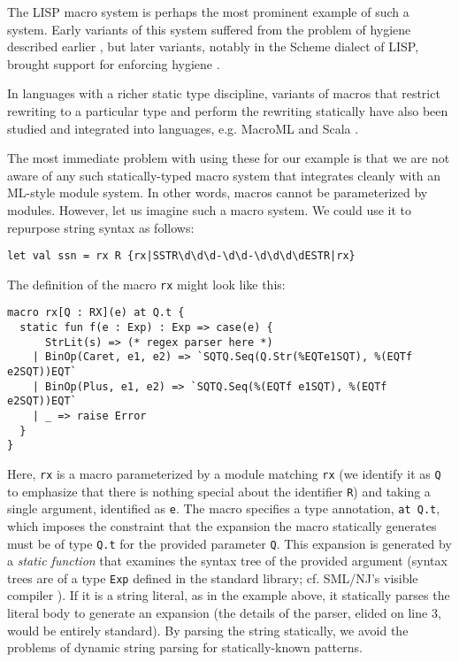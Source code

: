 {{The LISP macro system \cite{Hart63a} is perhaps the most prominent example of such a system. Early variants of this system suffered from the problem of hygiene described earlier , but  later variants, notably in the Scheme dialect of LISP, brought support for enforcing hygiene \cite{Kohlbecker86a}. 

In languages with a richer static type discipline, variants of macros that restrict rewriting to a particular type and perform the rewriting statically have also been studied \cite{Herman10:Theory,ganz2001macros} and integrated into languages, e.g. MacroML \cite{ganz2001macros} and Scala \cite{ScalaMacros2013}.  %

The most immediate problem with using these for our example is that we are not aware of any such statically-typed macro system that integrates cleanly with an ML-style module system. In other words, macros cannot be parameterized by modules. However, let us imagine such a macro system. We could use it to repurpose string syntax  as follows:
\begin{lstlisting}[numbers=none]
let val ssn = rx R {rx|SSTR\d\d\d-\d\d-\d\d\d\dESTR|rx}
\end{lstlisting}

The definition of the macro \lstinline{rx} might look like this:
\begin{lstlisting}
macro rx[Q : RX](e) at Q.t {
  static fun f(e : Exp) : Exp => case(e) {
      StrLit(s) => (* regex parser here *)
    | BinOp(Caret, e1, e2) => `SQTQ.Seq(Q.Str(%EQTe1SQT), %(EQTf e2SQT))EQT`
    | BinOp(Plus, e1, e2) => `SQTQ.Seq(%(EQTf e1SQT), %(EQTf e2SQT))EQT`
    | _ => raise Error
  }
}
\end{lstlisting}

Here, \lstinline{rx} is a macro parameterized by a module matching \lstinline{rx} (we identify it as \lstinline{Q} to emphasize that there is nothing special about the identifier \lstinline{R}) and taking a single argument, identified as \lstinline{e}. The macro specifies a type annotation, \lstinline{at Q.t}, which imposes the constraint that the expansion the macro statically generates must be of type \lstinline{Q.t} for the provided parameter \lstinline{Q}. This expansion is generated by a \emph{static function} that examines the syntax tree of the provided argument (syntax trees are of a type \lstinline{Exp} defined in the standard library; cf. SML/NJ's visible compiler \cite{SML/VisibleCompiler}). If it is a string literal, as in the example above, it statically parses the literal body to generate an expansion (the details of the parser, elided on line 3, would be entirely standard). 
By parsing the string statically, we avoid the problems of dynamic string parsing for statically-known patterns. 

}}
